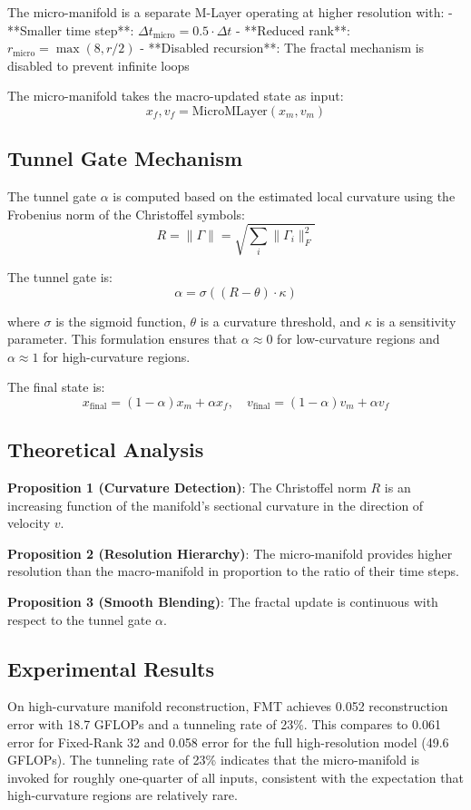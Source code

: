 The micro-manifold is a separate M-Layer operating at higher resolution with:
- **Smaller time step**: $\Delta t_\text{micro} = 0.5 \cdot \Delta t$
- **Reduced rank**: $r_\text{micro} = \max(8, r/2)$
- **Disabled recursion**: The fractal mechanism is disabled to prevent infinite loops

The micro-manifold takes the macro-updated state as input:
$$x_f, v_f = \text{MicroMLayer}(x_m, v_m)$$

\subsection{Tunnel Gate Mechanism}
The tunnel gate $\alpha$ is computed based on the estimated local curvature using the Frobenius norm of the Christoffel symbols:
$$R = \|\Gamma\| = \sqrt{\sum_i \|\Gamma_i\|_F^2}$$

The tunnel gate is:
$$\alpha = \sigma((R - \theta) \cdot \kappa)$$

where $\sigma$ is the sigmoid function, $\theta$ is a curvature threshold, and $\kappa$ is a sensitivity parameter. This formulation ensures that $\alpha \approx 0$ for low-curvature regions and $\alpha \approx 1$ for high-curvature regions.

The final state is:
$$x_{\text{final}} = (1-\alpha)x_m + \alpha x_f, \quad v_{\text{final}} = (1-\alpha)v_m + \alpha v_f$$

\subsection{Theoretical Analysis}
\textbf{Proposition 1 (Curvature Detection)}: The Christoffel norm $R$ is an increasing function of the manifold's sectional curvature in the direction of velocity $v$.

\textbf{Proposition 2 (Resolution Hierarchy)}: The micro-manifold provides higher resolution than the macro-manifold in proportion to the ratio of their time steps.

\textbf{Proposition 3 (Smooth Blending)}: The fractal update is continuous with respect to the tunnel gate $\alpha$.

\subsection{Experimental Results}
On high-curvature manifold reconstruction, FMT achieves 0.052 reconstruction error with 18.7 GFLOPs and a tunneling rate of 23\%. This compares to 0.061 error for Fixed-Rank 32 and 0.058 error for the full high-resolution model (49.6 GFLOPs). The tunneling rate of 23\% indicates that the micro-manifold is invoked for roughly one-quarter of all inputs, consistent with the expectation that high-curvature regions are relatively rare.

